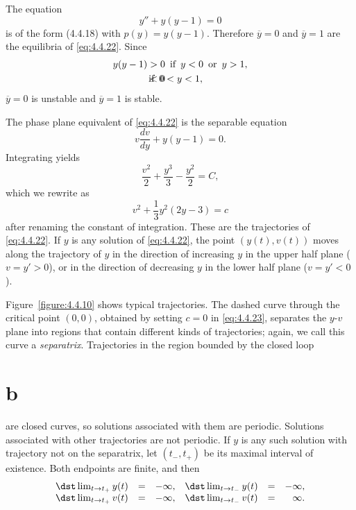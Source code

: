 \begin{example}
  \label{example:4.4.3}\rm The equation
  \begin{equation}
    \label{eq:4.4.22}y''+y(y-1)=0
  \end{equation}
  is of the form \textup{(4.4.18)} with $p(y)=y(y-1)$. Therefore $\overline{y}=0$ and
  $\overline{y}=1$ are the equilibria of \eqref{eq:4.4.22}. Since
  \begin{eqnarray*}
    y(y-1)>0 & \text{\, if \,}y<0\mbox{\, or \,}y>1, \\
    <0       & \hspace*{-22pt}\text{\, if \,}0<y<1,
  \end{eqnarray*}
  $\overline{y}=0$ is unstable and $\overline{y}=1$ is stable.

  The phase plane equivalent of \eqref{eq:4.4.22} is the separable equation
  \[
    v\frac{dv}{dy}+y(y-1)=0.
  \]
  Integrating yields
  \[
    \frac{v^{2}}{2}+\frac{y^{3}}{3}-\frac{y^{2}}{2}=C,
  \]
  which we rewrite as
  \begin{equation}
    \label{eq:4.4.23}v^{2}+\frac{1}{3}y^{2}(2y-3)=c
  \end{equation}
  after renaming the constant of integration. These are the trajectories of \eqref{eq:4.4.22}. If
  $y$ is any solution of \eqref{eq:4.4.22}, the point $(y(t),v(t))$ moves along the trajectory of
  $y$ in the direction of increasing $y$ in the upper half plane ($v=y'>0$), or in the direction of
  decreasing $y$ in the lower half plane ($v=y'<0$).

  Figure~\ref{figure:4.4.10} shows typical trajectories. The dashed curve through the critical point
  $(0,0)$, obtained by setting $c=0$ in \eqref{eq:4.4.23}, separates the $y$-$v$ plane into regions
  that contain different kinds of trajectories; again, we call this curve a {\relax\it
  separatrix\/}. Trajectories in the region bounded by the closed loop \part{b} are closed curves,
  so solutions associated with them are periodic. Solutions associated with other trajectories are
  not periodic. If $y$ is any such solution with trajectory not on the separatrix, let $(t_{-},t_{+})$ be its maximal interval of existence. Both endpoints are finite, and then
  \[
    \begin{array}{llrllr}
      \dst\lim_{t\to t_{+}}y(t) & = & -\infty, & \dst\lim_{t\to t_{-}}y(t) & = & -\infty, \\
      \dst\lim_{t\to t_{+}}v(t) & = & -\infty, & \dst\lim_{t\to t_{-}}v(t) & = & \infty.
    \end{array}
  \]


\end{example}
